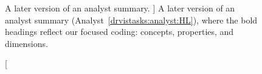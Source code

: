 \begin{figure}
    \centering
    \caption
    [
        A later version of an analyst summary.
    ]
    {
        A later version of an analyst summary (Analyst~\ref{drvistasks:analyst:HL}), where the bold headings reflect our focused coding: concepts, properties, and dimensions. 
    }
    \label{fig:hlsum}
    \centering
\end{figure}



